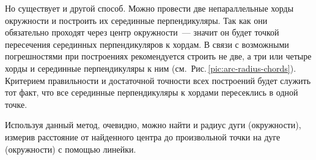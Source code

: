 Но существует и другой способ. Можно провести две непараллельные хорды окружности и построить их серединные перпендикуляры. Так как они обязательно проходят через центр окружности~--- значит он будет точкой пересечения серединных перпендикуляров к хордам. В связи с возможными погрешностями при построениях рекомендуется строить не две, а три или четыре хорды и серединные перпендикуляры к ним (см.~Рис.\,\ref{pic:arc-radius-chords}). Критерием правильности и достаточной точности всех построений будет служить тот факт, что все серединные перпендикуляры к хордами пересеклись в одной точке.

Используя данный метод, очевидно, можно найти и радиус дуги (окружности), измерив расстояние от найденного  центра до произвольной точки на дуге (окружности) с помощью линейки.

